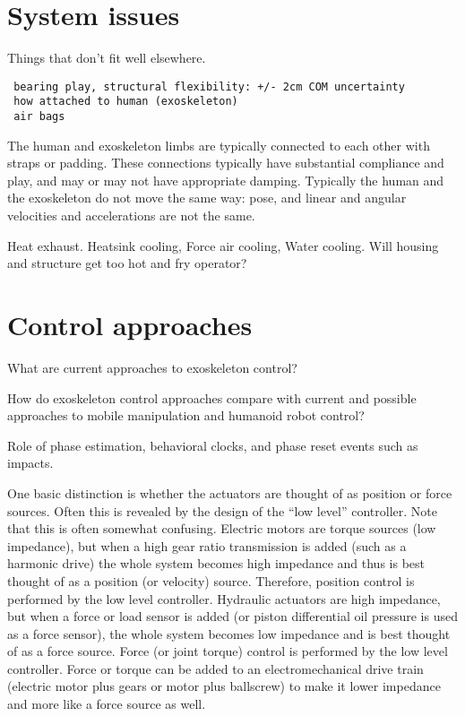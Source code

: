 \documentclass[letterpaper,12pt,fullpage]{article}
\begin{document}
\section{System issues}

Things that don't fit well elsewhere.

\begin{verbatim}
 bearing play, structural flexibility: +/- 2cm COM uncertainty
 how attached to human (exoskeleton)
 air bags
\end{verbatim}

The human and exoskeleton limbs are typically connected to each
other with straps or padding. These connections typically have substantial
compliance and play, and may or may not have appropriate damping.
Typically the human and the exoskeleton do not move the same way:
pose, and linear and angular velocities and accelerations are not the same.

Heat exhaust. Heatsink cooling, Force air cooling, Water cooling.
Will housing and structure get too hot and fry operator?

\section{Control approaches}

What are current approaches to exoskeleton control?

How do exoskeleton control approaches compare with current and
possible approaches to mobile manipulation and humanoid robot control?

Role of phase estimation, behavioral clocks, and phase reset events
such as impacts.

One basic distinction is whether the actuators are thought of as position
or force sources. Often this is revealed by the design of the ``low level''
controller. Note that this is often somewhat confusing. Electric motors
are torque sources (low impedance), but when a high gear ratio transmission
is added (such as a harmonic drive) the whole system becomes high impedance
and thus is best thought of as a position (or velocity) source. Therefore,
position control is performed by the low level controller. Hydraulic actuators
are high impedance, but when a force or load sensor is added (or piston differential
oil pressure is used as a force sensor), the whole system becomes low impedance
and is best thought of as a force source. Force (or joint torque) control is
performed by the low level controller. Force or torque can be added to an
electromechanical drive train (electric motor plus gears or motor plus ballscrew)
to make it lower impedance and more like a force source as well.
\end{document}
